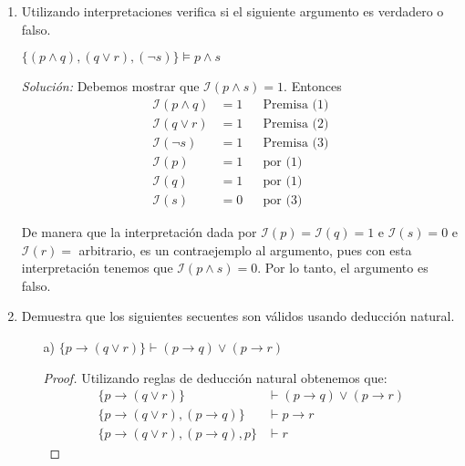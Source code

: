 \documentclass[letterpaper,11pt]{article}
\begin{document}
\begin{enumerate}
        \item Utilizando interpretaciones verifica si el siguiente argumento
        es verdadero o falso.
        \begin{center}
            $\{ (p \land q), (q \lor r), (\neg s) \} \models p \land s$
        \end{center}
        \textit{Solución:} Debemos mostrar que $\mathcal{I}(p \land s) = 1$.
        Entonces 
        \begin{align*}
            \mathcal{I}(p \land q) &= 1
            && \text{Premisa (1)} \\
            \mathcal{I}(q \lor r) &= 1
            && \text{Premisa (2)} \\
            \mathcal{I}(\neg s) &= 1 
            && \text{Premisa (3)} \\
            \mathcal{I}(p) &= 1
            && \text{por (1)} \\
            \mathcal{I}(q) &= 1
            && \text{por (1)} \\
            \mathcal{I}(s) &= 0
            && \text{por (3)}
        \end{align*}

        De manera que la interpretación dada por 
        $\mathcal{I}(p) = \mathcal{I}(q) = 1$ e $\mathcal{I}(s) = 0$ e 
        $\mathcal{I}(r) =$ arbitrario, es un contraejemplo al argumento, pues 
        con esta interpretación tenemos que $\mathcal{I}(p \land s) = 0$.
        Por lo tanto, el argumento es falso.

        \newpage
        \item Demuestra que los siguientes secuentes son válidos usando
        deducción natural.
        \begin{itemize}

            \item[a)] $\{ p \rightarrow (q \lor r) \} \vdash
            (p \rightarrow q) \lor (p \rightarrow r)$
            \begin{proof}
                Utilizando reglas de deducción natural obtenemos que:
                \begin{align*}
                    \{p \rightarrow (q \lor r)\} 
                    &\vdash (p \rightarrow q) \lor (p \rightarrow r) \\ 
                    \{p \rightarrow (q \lor r), (p \rightarrow q)\} 
                    &\vdash p \rightarrow r \\
                    \{p \rightarrow (q \lor r), (p \rightarrow q), p\} 
                    &\vdash r
                \end{align*}


\end{proof}
\end{itemize}
\end{enumerate}
\end{document}
